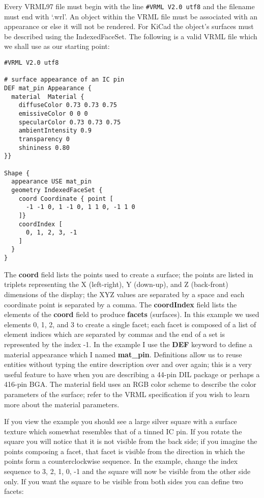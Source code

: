 \documentclass[a4paper, dvipdfm]{article}
\begin{document}
Every VRML97 file must begin with the line \verb~#VRML V2.0 utf8~ and the filename must end with `.wrl'. An object within the VRML file must
be associated with an appearance or else it will not be rendered. For KiCad the object's surfaces must be described using the IndexedFaceSet.
The following is a valid VRML file which we shall use as our starting point:

\begin{verbatim}
#VRML V2.0 utf8

# surface appearance of an IC pin
DEF mat_pin Appearance {
  material  Material {
    diffuseColor 0.73 0.73 0.75
    emissiveColor 0 0 0
    specularColor 0.73 0.73 0.75
    ambientIntensity 0.9
    transparency 0
    shininess 0.80
}}

Shape {
  appearance USE mat_pin
  geometry IndexedFaceSet {
    coord Coordinate { point [
      -1 -1 0, 1 -1 0, 1 1 0, -1 1 0
    ]}
    coordIndex [
      0, 1, 2, 3, -1
    ]
  }
}
\end{verbatim}

The \textbf{coord} field lists the points used to create a surface; the points are listed in triplets representing the X (left-right),
Y (down-up), and Z (back-front) dimensions of the display; the XYZ values are separated by a space and each coordinate point is
separated by a comma. The \textbf{coordIndex} field lists the elements of the \textbf{coord} field to produce \textbf{facets} (surfaces).
In this example we used elements 0, 1, 2, and 3 to create a single facet; each facet is composed of a list of element indices
which are separated by commas and the end of a set is represented by the index -1. In the example I use the \textbf{DEF} keyword
to define a material appearance which I named \textbf{mat\_pin}. Definitions allow us to reuse entities without typing the entire
description over and over again; this is a very useful feature to have when you are describing a 44-pin DIL package or perhaps a
416-pin BGA.  The material field uses an RGB color scheme to describe the color parameters of the surface; refer to the VRML
specification if you wish to learn more about the material parameters.

If you view the example you should see a large silver square with a surface texture which somewhat resembles that of a tinned IC pin.
If you rotate the square you will notice that it is not visible from the back side; if you imagine the points composing a facet, that facet
is visible from the direction in which the points form a counterclockwise sequence. In the example, change the index sequence to 3, 2, 1, 0, -1
and the square will now be visible from the other side only. If you want the square to be visible from both sides you can define two facets:
\end{document}
